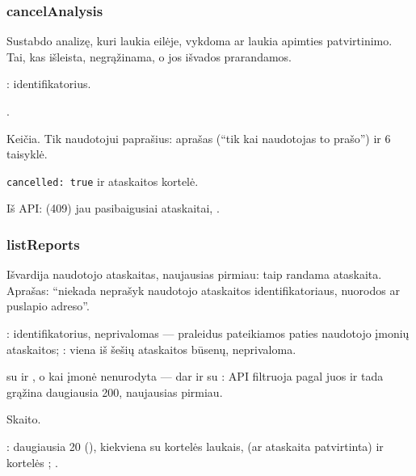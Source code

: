 \subsubsection{cancelAnalysis}\label{sec:tools:cancelAnalysis}
\begin{description}[style=multiline, leftmargin=19mm, labelwidth=17mm, labelsep=2mm,
  font=\sffamily\bfseries\footnotesize\color{ink}, itemsep=1pt, topsep=2pt, before=\raggedright]
  \item[Paskirtis] Sustabdo analizę, kuri laukia eilėje, vykdoma ar laukia apimties
    patvirtinimo. Tai, kas išleista, negrąžinama, o jos išvados prarandamos.
  \item[Įvestis] : identifikatorius.
  \item[Užklausos] .
  \item[Pobūdis] Keičia. Tik naudotojui paprašius: aprašas (\enquote{tik kai naudotojas to
    prašo}) ir 6 taisyklė.
  \item[Grąžina] \texttt{cancelled: true} ir ataskaitos kortelė.
  \item[Klaidos] Iš API:  (409) jau pasibaigusiai ataskaitai,
    .
\end{description}

\subsubsection{listReports}\label{sec:tools:listReports}
\begin{description}[style=multiline, leftmargin=19mm, labelwidth=17mm, labelsep=2mm,
  font=\sffamily\bfseries\footnotesize\color{ink}, itemsep=1pt, topsep=2pt, before=\raggedright]
  \item[Paskirtis] Išvardija naudotojo ataskaitas, naujausias pirmiau: taip randama
    ataskaita. Aprašas: \enquote{niekada neprašyk naudotojo ataskaitos identifikatoriaus,
    nuorodos ar puslapio adreso}.
  \item[Įvestis] : identifikatorius, neprivalomas --- praleidus pateikiamos
    paties naudotojo įmonių ataskaitos; : viena iš šešių
    ataskaitos būsenų, neprivaloma.
  \item[Užklausos]  su  ir , o kai įmonė
    nenurodyta --- dar ir su : API filtruoja pagal juos ir tada grąžina
    daugiausia 200, naujausias pirmiau.
  \item[Pobūdis] Skaito.
  \item[Grąžina] : daugiausia 20 (), kiekviena su kortelės
     laukais,  (ar ataskaita patvirtinta) ir kortelės
    ; .
\end{description}

